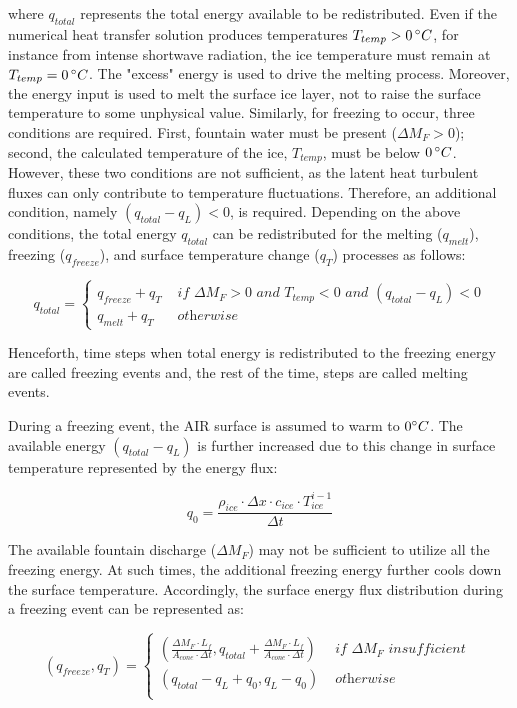 where $q_{total}$ represents the total energy available to be redistributed. Even if the numerical heat transfer
solution produces temperatures $T_{temp}>0\, ^{\circ} C$, for instance from intense shortwave radiation, the ice
temperature must remain at $T_{temp} = 0\, ^{\circ} C$. The "excess" energy is used to drive the melting
process. Moreover, the energy input is used to melt the surface ice layer, not to raise the surface
temperature to some unphysical value. Similarly, for freezing to occur, three conditions are required. First,
fountain water must be present ($\Delta M_{F} > 0 $); second, the calculated temperature of the ice, $T_{temp}$,
must be below $0\, ^{\circ} C$. However, these two conditions are not sufficient, as the latent heat turbulent fluxes
can only contribute to temperature fluctuations. Therefore, an additional condition, namely $(q_{total}-q_{L})
	< 0$, is required. Depending on the above conditions, the total energy $q_{total}$ can be redistributed
for the melting ($q_{melt}$), freezing ($q_{freeze}$), and surface temperature change ($q_{T}$) processes as
follows:

\begin{equation}
	q_{total} = \left\{ \begin{array}{ll}
		q_{freeze} + q_{T} & \textit{ if } \Delta M_{F} > 0 \textit{ and } T_{temp} < 0 \textit{ and }(q_{total}-q_{L}) < 0 \\
		q_{melt} + q_{T}   & \textit{ otherwise}
	\end{array} \right.
\end{equation}

Henceforth, time steps when total energy is redistributed to the freezing energy are called freezing
events and, the rest of the time, steps are called melting events.


During a freezing event, the \ac{AIR} surface is assumed to warm to $0 ^{\circ} C$. The available energy
$(q_{total}-q_{L})$ is further increased due to this change in surface temperature represented by the energy
flux:

$$q_{0} = \frac{\rho_{ice} \cdot \Delta x \cdot c_{ice} \cdot T_{ice}^{i-1}}{\Delta t}$$

The available fountain discharge ($\Delta M_{F}$) may not be sufficient to utilize all the freezing energy. At such times,
the additional freezing energy further cools down the surface temperature. Accordingly, the surface energy flux
distribution during a freezing event can be represented as:

\begin{equation}
	(q_{freeze}, q_{T}) = \left\{ \begin{array}{ll}
		(\frac{\Delta M_{F} \cdot L_f
		}{A_{cone} \cdot \Delta t}
		, q_{total}+\frac{\Delta M_{F} \cdot L_f
		}{A_{cone} \cdot \Delta t})          & \textit{ if  } \Delta M_{F} \textit{ insufficient } \\
		(q_{total}-q_{L}+q_{0}, q_{L}-q_{0}) & \textit{ otherwise }                                \\
	\end{array} \right.
\end{equation}

